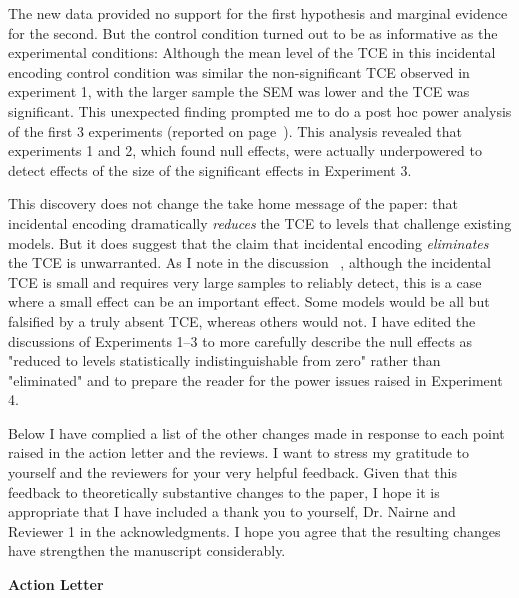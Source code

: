 \documentclass[12pt]{article}
\begin{document}
The new data provided no support for the first hypothesis and marginal evidence for the second. But the control condition turned out to be as informative as the experimental conditions: Although the mean level of the TCE in this incidental encoding control condition was similar the non-significant TCE observed in experiment 1, with the larger sample the SEM was lower and the TCE was significant. This unexpected finding prompted me to do a post hoc power analysis of the first 3 experiments (reported on page~\pageref{power}). This analysis revealed that experiments 1 and 2, which found null effects, were actually underpowered to detect effects of the size of the significant effects in Experiment 3. 

This discovery does not change the take home message of the paper: that incidental encoding dramatically \emph{reduces} the TCE to levels that challenge existing models. But it does suggest that the claim that incidental encoding \emph{eliminates} the TCE is unwarranted. As I note in the discussion ~\pageref{zerovsnear}, although the incidental TCE is small and requires very large samples to reliably detect, this is a case where a small effect can be an important effect. Some models would be all but falsified by a truly absent TCE, whereas others would not. I have edited the discussions of Experiments 1--3 to more carefully describe the null effects as "reduced to levels statistically indistinguishable from zero" rather than "eliminated" and to prepare the reader for the power issues raised in Experiment 4.

Below I have complied a list of the other changes made in response to each point raised in the action letter and the reviews. I want to stress my gratitude to yourself and the reviewers for your very helpful feedback. Given that this feedback to theoretically substantive changes to the paper, I hope it is appropriate that I have included a thank you to yourself, Dr. Nairne and Reviewer 1 in the acknowledgments. I hope you agree that the resulting changes have strengthen the manuscript considerably.

\vspace{20pt}

\textbf{\large{Action Letter}}
\end{document}
